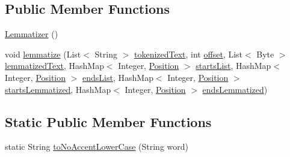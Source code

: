 \subsection*{Public Member Functions}
\begin{DoxyCompactItemize}
\item 
\hyperlink{classbr_1_1usp_1_1cata_1_1util_1_1lemmatizer_1_1_lemmatizer_a41d31b5eeb636c3169529cafb97c84bc}{Lemmatizer} ()
\item 
void \hyperlink{classbr_1_1usp_1_1cata_1_1util_1_1lemmatizer_1_1_lemmatizer_a7bc40a2c75a57c90796b0f2c2c4ddb3d}{lemmatize} (List$<$ String $>$ \hyperlink{classbr_1_1usp_1_1cata_1_1util_1_1lemmatizer_1_1_lemmatizer_ab5453be564488535adc8bc699992b71c}{tokenized\+Text}, int \hyperlink{classbr_1_1usp_1_1cata_1_1util_1_1lemmatizer_1_1_lemmatizer_a3051729334b2dc06ccfdfc174e626855}{offset}, List$<$ Byte $>$ \hyperlink{classbr_1_1usp_1_1cata_1_1util_1_1lemmatizer_1_1_lemmatizer_a2476d96edabe8b1b909ea9edcc93113b}{lemmatized\+Text}, Hash\+Map$<$ Integer, \hyperlink{classbr_1_1usp_1_1cata_1_1model_1_1_position}{Position} $>$ \hyperlink{classbr_1_1usp_1_1cata_1_1util_1_1lemmatizer_1_1_lemmatizer_a35596ef32451200dea1d847f77ca81dd}{starts\+List}, Hash\+Map$<$ Integer, \hyperlink{classbr_1_1usp_1_1cata_1_1model_1_1_position}{Position} $>$ \hyperlink{classbr_1_1usp_1_1cata_1_1util_1_1lemmatizer_1_1_lemmatizer_aa1c7ffc1a12b20366170487a64092d24}{ends\+List}, Hash\+Map$<$ Integer, \hyperlink{classbr_1_1usp_1_1cata_1_1model_1_1_position}{Position} $>$ \hyperlink{classbr_1_1usp_1_1cata_1_1util_1_1lemmatizer_1_1_lemmatizer_ace928e8e1187785e623af7d55f68db32}{starts\+Lemmatized}, Hash\+Map$<$ Integer, \hyperlink{classbr_1_1usp_1_1cata_1_1model_1_1_position}{Position} $>$ \hyperlink{classbr_1_1usp_1_1cata_1_1util_1_1lemmatizer_1_1_lemmatizer_a6970d634314b89b020bb62b16d66182f}{ends\+Lemmatized})
\end{DoxyCompactItemize}
\subsection*{Static Public Member Functions}
\begin{DoxyCompactItemize}
\item 
static String \hyperlink{classbr_1_1usp_1_1cata_1_1util_1_1lemmatizer_1_1_lemmatizer_a3ae79862b511b5313c75f902dddb79ea}{to\+No\+Accent\+Lower\+Case} (String word)
\end{DoxyCompactItemize}
